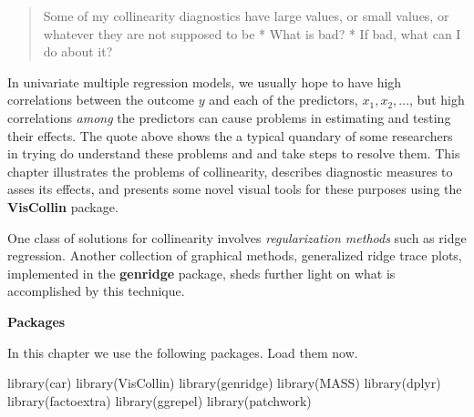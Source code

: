 \documentclass[
  letterpaper,
  10pt,
  krantz2]{krantz}
\makeatletter
\newenvironment{Shaded}{\begin{snugshade}}{\end{snugshade}}
\newcommand{\FunctionTok}[1]{\textcolor[rgb]{0.28,0.35,0.67}{#1}}
\newcommand{\NormalTok}[1]{\textcolor[rgb]{0.00,0.23,0.31}{#1}}
\newenvironment{kframe}{%
  \medskip{}
  \setlength{\fboxsep}{.8em}
  \def\at@end@of@kframe{}%
  \ifinner\ifhmode%
  \def\at@end@of@kframe{\end{minipage}}%
  \begin{minipage}{\columnwidth}%
  \fi\fi%
  \def\FrameCommand##1{\hskip\@totalleftmargin \hskip-\fboxsep
  \colorbox{shadecolor}{##1}\hskip-\fboxsep
      \hskip-\linewidth \hskip-\@totalleftmargin \hskip\columnwidth}%
  \MakeFramed {\advance\hsize-\width
    \@totalleftmargin\z@ \linewidth\hsize
    \@setminipage}}%
{\par\unskip\endMakeFramed%
  \at@end@of@kframe}
\renewenvironment{Shaded}{\begin{kframe}}{\end{kframe}}
\makeatother
\begin{document}
\newcommand{\sizedmat}[2]{\mathord{\mathop{\mat{#1}}\limits_{#2}}}

\renewcommand*{\H}{\mathbf{H}}               
\newcommand*{\E}{\mathbf{E}}
\newcommand*{\widebar}[1]{\overline{#1}}

\newcommand{\Var}{\mathsf{Var}}
\newcommand{\Cov}{\mathsf{Cov}}
\newcommand{\HO}{\mathcal{H}_0}

\newcommand*{\V}{\mathcal{V}}

\newcommand{\pkg}[1]{\textsf{#1}}
\newcommand{\Rpackage}[1]{\pkg{#1} package}

\begin{quote}
Some of my collinearity diagnostics have large values, or small values,
or whatever they are not supposed to be * What is bad? * If bad, what
can I do about it?
\end{quote}

In univariate multiple regression models, we usually hope to have high
correlations between the outcome \(y\) and each of the predictors,
\(x_1, x_2, \dots\), but high correlations \emph{among} the predictors
can cause problems in estimating and testing their effects. The quote
above shows the a typical quandary of some researchers in trying do
understand these problems and and take steps to resolve them. This
chapter illustrates the problems of collinearity, describes diagnostic
measures to asses its effects, and presents some novel visual tools for
these purposes using the \textbf{VisCollin} package.

One class of solutions for collinearity involves \emph{regularization
methods} such as ridge regression. Another collection of graphical
methods, generalized ridge trace plots, implemented in the
\textbf{genridge} package, sheds further light on what is accomplished
by this technique.

\textbf{Packages}

In this chapter we use the following packages. Load them now.

\begin{Shaded}
\begin{Highlighting}[]
\FunctionTok{library}\NormalTok{(car)}
\FunctionTok{library}\NormalTok{(VisCollin)}
\FunctionTok{library}\NormalTok{(genridge)}
\FunctionTok{library}\NormalTok{(MASS)}
\FunctionTok{library}\NormalTok{(dplyr)}
\FunctionTok{library}\NormalTok{(factoextra)}
\FunctionTok{library}\NormalTok{(ggrepel)}
\FunctionTok{library}\NormalTok{(patchwork)}
\end{Highlighting}
\end{Shaded}
\end{document}
